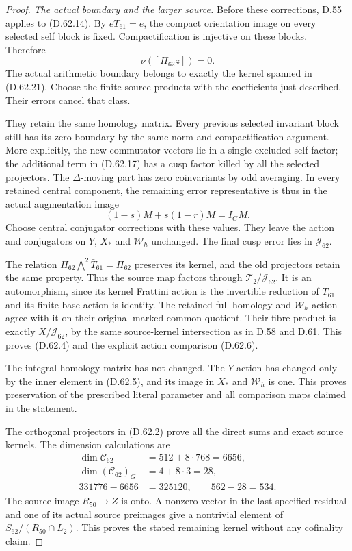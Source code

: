 \begin{proof}
\emph{The actual boundary and the larger source.}
Before these corrections, D.55
applies to (D.62.14). By
\(eT_{61}=e\), the compact
orientation image on every
selected self block is fixed.
Compactification is injective
on these blocks. Therefore
\[
                   \nu([\Pi_{62}z])=0.
 \tag{D.62.22}
\]
The actual arithmetic boundary
belongs to exactly the kernel
spanned in (D.62.21). Choose
the finite source products with
the coefficients just described.
Their errors cancel that class.

They retain the same homology
matrix. Every previous selected
invariant block still has its
zero boundary by the same norm
and compactification argument.
More explicitly, the new
commutator vectors lie in a
single excluded self factor;
the additional term in (D.62.17)
has a cusp factor killed by all
the selected projectors. The
\(\Delta\)-moving part has zero
coinvariants by odd averaging.
In every retained central
component, the remaining error
representative is thus in the
actual augmentation image
\[
                    (1-s)M+s(1-r)M=I_GM.
 \tag{D.62.23}
\]
Choose central conjugator corrections
with these values. They leave the
action and conjugators on \(Y\),
\(X_*\) and \(\mathcal W_h\)
unchanged. The final cusp error
lies in \(\mathcal J_{62}\).

The relation
\(\Pi_{62}\bigwedge^2\bar T_{61}=\Pi_{62}\)
preserves its kernel, and the old
projectors retain the same property.
Thus the source map factors
through \(\mathcal T_2/\mathcal J_{62}\).
It is an automorphism, since its
kernel Frattini action is the
invertible reduction of \(T_{61}\)
and its finite base action is
identity. The retained full
homology and \(\mathcal W_h\)
action agree with it on their
original marked common quotient.
Their fibre product is exactly
\(X/\mathcal J_{62}\), by the
same source-kernel intersection
as in D.58 and D.61. This proves
(D.62.4) and the explicit action
comparison (D.62.6).

The integral homology matrix
has not changed. The \(Y\)-action
has changed only by the inner
element in (D.62.5), and its
image in \(X_*\) and
\(\mathcal W_h\) is one.
This proves preservation of
the prescribed literal parameter
and all comparison maps claimed
in the statement.

The orthogonal projectors in
(D.62.2) prove all the direct
sums and exact source kernels.
The dimension calculations are
\[
 \begin{aligned}
 \dim\mathcal C_{62}&=512+8\cdot768=6656,\\
 \dim(\mathcal C_{62})_G&=4+8\cdot3=28,\\
 331776-6656&=325120,\qquad562-28=534.
 \end{aligned}
 \tag{D.62.24}
\]
The source image \(R_{50}\to Z\)
is onto. A nonzero vector in
the last specified residual and
one of its actual source preimages
give a nontrivial element of
\(S_{62}/(R_{50}\cap L_2)\).
This proves the stated remaining
kernel without any cofinality claim.


\end{proof}
